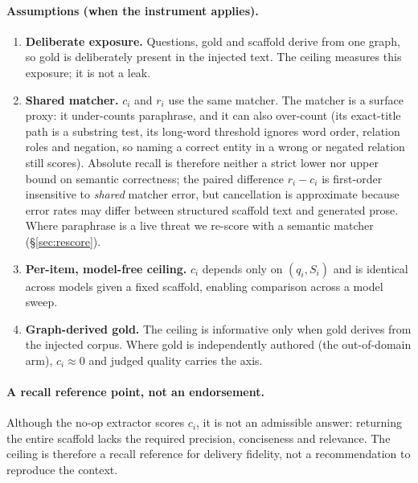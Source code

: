 \paragraph{Assumptions (when the instrument applies).}
\begin{enumerate}[label=(A\arabic*),topsep=2pt,itemsep=1pt,leftmargin=2.4em]
\item \textbf{Deliberate exposure.} Questions, gold and scaffold derive from one graph, so gold is deliberately present in the injected text. The ceiling measures this exposure; it is not a leak.
\item \textbf{Shared matcher.} $c_i$ and $r_i$ use the same matcher. The matcher is a surface proxy: it under-counts paraphrase, and it can also over-count (its exact-title path is a substring test, its long-word threshold ignores word order, relation roles and negation, so naming a correct entity in a wrong or negated relation still scores). Absolute recall is therefore neither a strict lower nor upper bound on semantic correctness; the paired difference $r_i-c_i$ is first-order insensitive to \emph{shared} matcher error, but cancellation is approximate because error rates may differ between structured scaffold text and generated prose. Where paraphrase is a live threat we re-score with a semantic matcher (\S\ref{sec:rescore}).
\item \textbf{Per-item, model-free ceiling.} $c_i$ depends only on $(q_i,S_i)$ and is identical across models given a fixed scaffold, enabling comparison across a model sweep.
\item \textbf{Graph-derived gold.} The ceiling is informative only when gold derives from the injected corpus. Where gold is independently authored (the out-of-domain arm), $c_i\approx0$ and judged quality carries the axis.
\end{enumerate}

\paragraph{A recall reference point, not an endorsement.} Although the no-op extractor scores $c_i$, it is not an admissible answer: returning the entire scaffold lacks the required precision, conciseness and relevance. The ceiling is therefore a recall reference for delivery fidelity, not a recommendation to reproduce the context.

